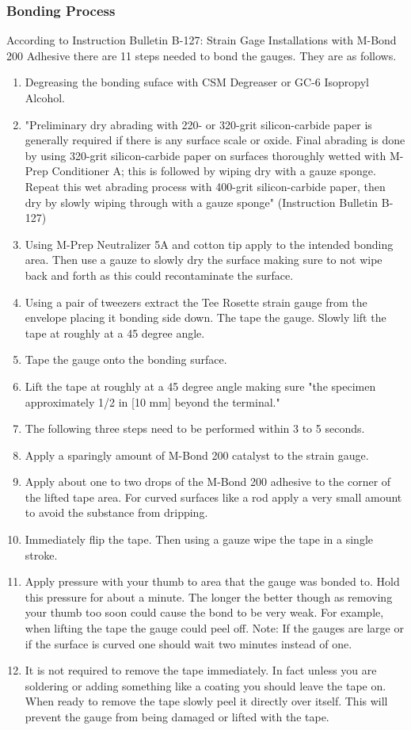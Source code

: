 \subsubsection{Bonding Process}
According to Instruction Bulletin B-127: Strain Gage Installations with M-Bond 200 Adhesive there are 11 steps needed to bond the gauges. They are as follows.
\vspace{1em}
\begin{enumerate}
    \item Degreasing the bonding suface with CSM Degreaser or GC-6 Isopropyl Alcohol.
    \item "Preliminary dry abrading with 220- or 320-grit silicon-carbide paper is generally required if there is any surface scale or oxide. Final abrading is done by using 320-grit silicon-carbide paper on surfaces thoroughly wetted with M-Prep Conditioner A; this is followed by wiping dry with a gauze sponge. Repeat this wet abrading process with 400-grit silicon-carbide paper, then dry by slowly wiping through with a gauze sponge" (Instruction Bulletin B-127)
    \item Using M-Prep Neutralizer 5A and cotton tip apply to the intended bonding area. Then use a gauze to slowly dry the surface making sure to not wipe back and forth as this could recontaminate the surface.
    \item Using a pair of tweezers extract the Tee Rosette strain gauge from the envelope placing it bonding side down. The tape the gauge. Slowly lift the tape at roughly at a  45 degree angle.
    \item Tape the gauge onto the bonding surface.
    \item Lift the tape at roughly at a 45 degree angle making sure "the specimen approximately 1/2 in [10 mm] beyond the terminal."
    \item The following three steps need to be performed within 3 to 5 seconds.
    \item Apply a sparingly amount of M-Bond 200 catalyst to the strain gauge. 
    \item Apply about one to two drops of the M-Bond 200 adhesive to the corner of the lifted tape area. For curved surfaces like a rod apply a very small amount to avoid the substance from dripping. 
    \item Immediately flip the tape. Then using a gauze wipe the tape in a single stroke.
    \item Apply pressure with your thumb to area that the gauge was bonded to. Hold this pressure for about a minute. The longer the better though as removing your thumb too soon could cause the bond to be very weak. For example, when lifting the tape the gauge could peel off. Note: If the gauges are large or if the surface is curved one should wait two minutes instead of one.
    \item It is not required to remove the tape immediately. In fact unless you are soldering or adding something like a  coating you should leave the tape on. When ready to remove the tape slowly peel it directly over itself. This will prevent the gauge from being damaged or lifted with the tape. 
\end{enumerate}

